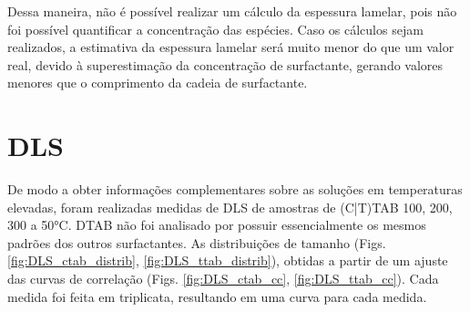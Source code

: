 	Dessa maneira, não é possível realizar um cálculo da espessura lamelar, pois não foi possível quantificar a concentração das espécies. Caso os cálculos sejam realizados, a estimativa da espessura lamelar será muito menor do que um valor real, devido à superestimação da concentração de surfactante, gerando valores menores que o comprimento da cadeia de surfactante.
	
\section{DLS}
\label{sec:Ureia-DLS}

	De modo a obter informações complementares sobre as soluções em temperaturas elevadas, foram realizadas medidas de DLS de amostras de (C|T)TAB 100, 200, 300 \mM{} a 50°C. DTAB não foi analisado por possuir essencialmente os mesmos padrões dos outros surfactantes. As distribuições de tamanho (Figs. \ref{fig:DLS_ctab_distrib}, \ref{fig:DLS_ttab_distrib}), obtidas a partir de um ajuste das curvas de correlação (Figs. \ref{fig:DLS_ctab_cc}, \ref{fig:DLS_ttab_cc}). Cada medida foi feita em triplicata, resultando em uma curva para cada medida.
	

